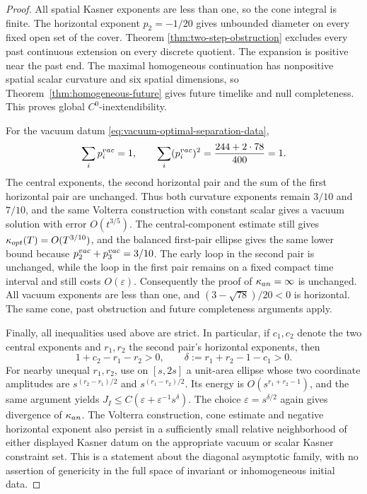 \documentclass[10pt,a4paper]{amsart}
\begin{document}
\begin{proof}
All spatial Kasner exponents are less than one, so the cone integral
is finite.  The horizontal exponent $p_2=-1/20$ gives unbounded
diameter on every fixed open set of the cover.  Theorem
\ref{thm:two-step-obstruction} excludes every past continuous extension
on every discrete quotient.  The expansion is positive near the past
end.  The maximal homogeneous continuation has nonpositive spatial
scalar curvature and six spatial dimensions, so
Theorem~\ref{thm:homogeneous-future} gives future timelike and null
completeness.  This proves global $C^0$-inextendibility.

For the vacuum datum \eqref{eq:vacuum-optimal-separation-data},
\[
 \sum_i p_i^{\rm vac}=1,\qquad
 \sum_i(p_i^{\rm vac})^2
   =\frac{244+2\cdot78}{400}=1.
\]
The central exponents, the second horizontal pair and the sum of
the first horizontal pair are unchanged.  Thus both curvature
exponents remain $3/10$ and $7/10$, and the same Volterra construction
with constant scalar gives a vacuum solution with error $O(t^{3/5})$.
The central-component estimate still gives
$\kappa_{\rm opt}(T)=O(T^{3/10})$, and the balanced first-pair
ellipse gives the same lower bound because
$p_2^{\rm vac}+p_3^{\rm vac}=3/10$.
The early loop in the second pair
is unchanged, while the loop in the first pair remains on a fixed
compact time interval and still costs $O(\varepsilon)$.
Consequently the proof of $\kappa_{\rm an}=\infty$ is unchanged.
All vacuum exponents are less than one, and
$(3-\sqrt{78})/20<0$ is horizontal.  The same cone, past obstruction
and future completeness arguments apply.

Finally, all inequalities used above are strict.  In particular, if
$c_1,c_2$ denote the two central exponents and $r_1,r_2$ the second
pair's horizontal exponents, then
\[
 1+c_2-r_1-r_2>0,
 \qquad \delta:=r_1+r_2-1-c_1>0.
\]
For nearby unequal $r_1,r_2$, use on $[s,2s]$ a unit-area ellipse
whose two coordinate amplitudes are
$s^{(r_2-r_1)/2}$ and $s^{(r_1-r_2)/2}$.
Its energy is $O(s^{r_1+r_2-1})$, and the same argument yields
$J_I\le C(\varepsilon+\varepsilon^{-1}s^\delta)$.
The choice $\varepsilon=s^{\delta/2}$ again gives divergence of
$\kappa_{\rm an}$.  The Volterra construction, cone estimate and
negative horizontal exponent also persist in a sufficiently small
relative neighborhood of either displayed Kasner datum on the
appropriate vacuum or scalar Kasner constraint set.  This is a
statement about the diagonal
asymptotic family, with no assertion of genericity in the full space
of invariant or inhomogeneous initial data.
\end{proof}
\end{document}

